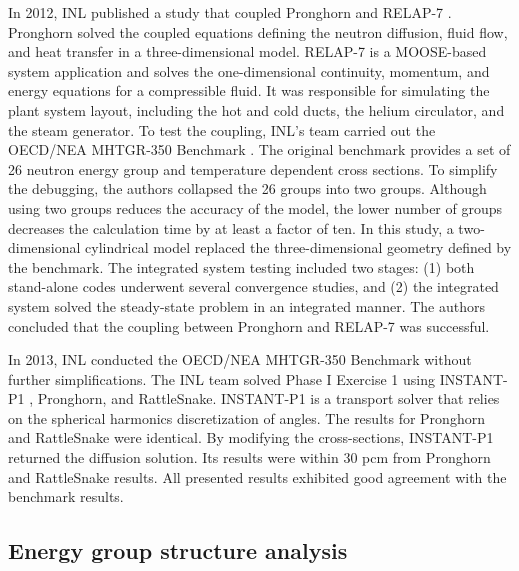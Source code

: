 In 2012, \gls{INL} published a study \cite{j_ortensi_initial_2012} that coupled Pronghorn and RELAP-7 \cite{andrs_relap-7_2012}.
Pronghorn solved the coupled equations defining the neutron diffusion, fluid flow, and heat transfer in a three-dimensional model.
RELAP-7 is a MOOSE-based system application and solves the one-dimensional continuity, momentum, and energy equations for a compressible fluid.
It was responsible for simulating the plant system layout, including the hot and cold ducts, the helium circulator, and the steam generator.
To test the coupling, INL's team carried out the OECD/NEA MHTGR-350 Benchmark \cite{oecd_nea_coupled_2020}.
The original benchmark provides a set of 26 neutron energy group and temperature dependent cross sections.
To simplify the debugging, the authors collapsed the 26 groups into two groups.
Although using two groups reduces the accuracy of the model, the lower number of groups decreases the calculation time by at least a factor of ten.
In this study, a two-dimensional cylindrical model replaced the three-dimensional geometry defined by the benchmark.
The integrated system testing included two stages: (1) both stand-alone codes underwent several convergence studies, and (2) the integrated system solved the steady-state problem in an integrated manner.
The authors concluded that the coupling between Pronghorn and RELAP-7 was successful.

In 2013, \gls{INL} conducted the OECD/NEA MHTGR-350 Benchmark \cite{strydom_inl_2013} without further simplifications.
The \gls{INL} team solved Phase I Exercise 1 using INSTANT-P1 \cite{wang_krylov_2011}, Pronghorn, and RattleSnake.
INSTANT-P1 is a transport solver that relies on the spherical harmonics discretization of angles.
The results for Pronghorn and RattleSnake were identical.
By modifying the cross-sections, INSTANT-P1 returned the diffusion solution.
Its results were within 30 pcm from Pronghorn and RattleSnake results.
All presented results exhibited good agreement with the benchmark results.

\subsection{Energy group structure analysis}

